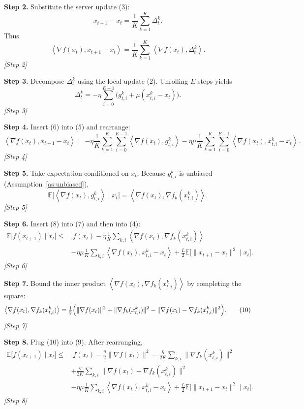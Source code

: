 \documentclass{article}
\newcommand{\EE}{\mathbb{E}}
\newcommand{\inner}[2]{\left\langle #1,#2\right\rangle}
\begin{document}
\noindent\textbf{Step 2.}  Substitute the server update (3):
\[
x_{t+1}-x_t = \frac1K\sum_{k=1}^{K}\Delta_{t}^{k}.
\]
Thus
\[
\inner{\nabla f(x_t)}{x_{t+1}-x_t}
= \frac1K\sum_{k=1}^{K}\inner{\nabla f(x_t)}{\Delta_{t}^{k}}.
\tag{5}
\]
\textit{[Step 2]}

\noindent\textbf{Step 3.}  Decompose $\Delta_{t}^{k}$ using the local update (2).  Unrolling $E$ steps yields
\[
\Delta_{t}^{k}= -\eta\sum_{i=0}^{E-1}\bigl(g_{t,i}^{k}+ \mu (x_{t,i}^{k}-x_t)\bigr).
\tag{6}
\]
\textit{[Step 3]}

\noindent\textbf{Step 4.}  Insert (6) into (5) and rearrange:
\[
\inner{\nabla f(x_t)}{x_{t+1}-x_t}
= -\eta\frac1K\sum_{k=1}^{K}\sum_{i=0}^{E-1}
\inner{\nabla f(x_t)}{g_{t,i}^{k}}
-\eta\mu\frac1K\sum_{k=1}^{K}\sum_{i=0}^{E-1}
\inner{\nabla f(x_t)}{x_{t,i}^{k}-x_t}.
\tag{7}
\]
\textit{[Step 4]}

\noindent\textbf{Step 5.}  Take expectation conditioned on $x_t$.
Because $g_{t,i}^{k}$ is unbiased (Assumption~\ref{as:unbiased}),
\[
\EE\!\bigl[\inner{\nabla f(x_t)}{g_{t,i}^{k}}\mid x_t\bigr]
= \inner{\nabla f(x_t)}{\nabla f_k(x_{t,i}^{k})}.
\tag{8}
\]
\textit{[Step 5]}

\noindent\textbf{Step 6.}  Insert (8) into (7) and then into (4):
\[
\begin{aligned}
\EE\bigl[f(x_{t+1})\mid x_t\bigr]
\le&\; f(x_t)
 -\eta\frac1K\sum_{k,i}\inner{\nabla f(x_t)}{\nabla f_k(x_{t,i}^{k})}\\
&-\eta\mu\frac1K\sum_{k,i}\inner{\nabla f(x_t)}{x_{t,i}^{k}-x_t}
+\frac{L}{2}\EE\!\bigl[\|x_{t+1}-x_t\|^2\mid x_t\bigr].
\end{aligned}
\tag{9}
\]
\textit{[Step 6]}

\noindent\textbf{Step 7.}  Bound the inner product $\inner{\nabla f(x_t)}{\nabla f_k(x_{t,i}^{k})}$ by completing the square:
\[
\inner{\nabla f(x_t)}{\nabla f_k(x_{t,i}^{k})}
= \tfrac12\Bigl(\|\nabla f(x_t)\|^2+\|\nabla f_k(x_{t,i}^{k})\|^2
               -\|\nabla f(x_t)-\nabla f_k(x_{t,i}^{k})\|^2\Bigr).
\tag{10}
\]
\textit{[Step 7]}

\noindent\textbf{Step 8.}  Plug (10) into (9).  After rearranging,
\[
\begin{aligned}
\EE\bigl[f(x_{t+1})\mid x_t\bigr]
\le&\; f(x_t) -\frac{\eta}{2}\|\nabla f(x_t)\|^2
     -\frac{\eta}{2K}\sum_{k,i}\|\nabla f_k(x_{t,i}^{k})\|^2\\
   &+\frac{\eta}{2K}\sum_{k,i}\|\nabla f(x_t)-\nabla f_k(x_{t,i}^{k})\|^2\\
   &-\eta\mu\frac1K\sum_{k,i}\inner{\nabla f(x_t)}{x_{t,i}^{k}-x_t}
   +\frac{L}{2}\EE\!\bigl[\|x_{t+1}-x_t\|^2\mid x_t\bigr].
\end{aligned}
\tag{11}
\]
\textit{[Step 8]}
\end{document}
